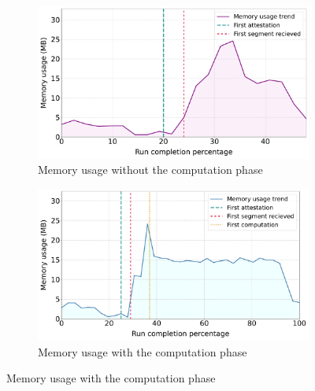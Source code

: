 \begin{figure}[t]
\centering
\begin{subfigure}{0.49\textwidth}
  \centering
  \includegraphics[width=\textwidth]{content/figures/memoryusage1-2.pdf}
  \caption{Memory usage without the computation phase}
  \label{snr_a}
\end{subfigure}\hfill
\begin{subfigure}{0.49\textwidth}
  \centering
  \includegraphics[width=\textwidth]{content/figures/memoryusage2-2.pdf}
  \caption{Memory usage with the computation phase}
  \label{snr_b}   
\end{subfigure}


\end{figure}
